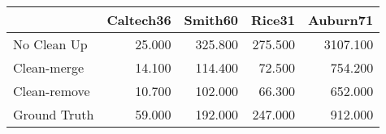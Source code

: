 \begin{tabular}{lrrrr}
\toprule
{} & Caltech36 & Smith60 &  Rice31 & Auburn71 \\
\midrule
No Clean Up  &    25.000 & 325.800 & 275.500 & 3107.100 \\
Clean-merge  &    14.100 & 114.400 &  72.500 &  754.200 \\
Clean-remove &    10.700 & 102.000 &  66.300 &  652.000 \\
Ground Truth &    59.000 & 192.000 & 247.000 &  912.000 \\
\bottomrule
\end{tabular}
